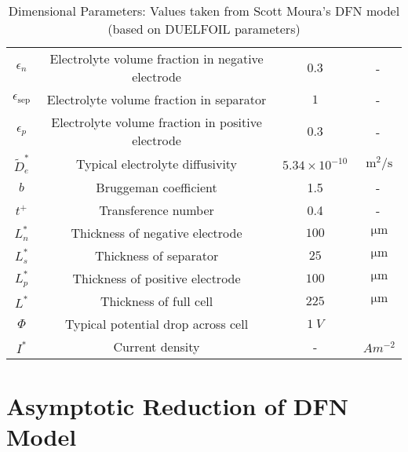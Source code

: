 \documentclass[preprint]{elsarticle}
\begin{document}
\begin{table}[h]
{\begin{tabular}{|c|c|c|c|}
        $\epsilon_n$ & Electrolyte volume fraction in negative electrode & $0.3$ & -\\
        $\epsilon_{\text{sep}}$ & Electrolyte volume fraction in separator & $1$ & -\\
        $\epsilon_p$ & Electrolyte volume fraction in positive electrode & $0.3$ & -\\
        $\tilde{D}_e^*$ & Typical electrolyte diffusivity & $5.34\times10^{-10}$ & $\SI{}{\metre^{2}/\second}$ \\
        $b$ & Bruggeman coefficient & 1.5 & - \\
        $t^+$ & Transference number & 0.4 & - \\
        $L_n^*$ & Thickness of negative electrode &$100$ & $\SI{}{\micro\metre}$  \\
        $L_{s}^*$ & Thickness of separator &$25$ & $\SI{}{\micro\metre}$ \\
        $L_p^*$ & Thickness of positive electrode &$100$ & $\SI{}{\micro\metre}$  \\ 
        $L^*$ & Thickness of full cell & $225$ & $\SI{}{\micro\metre}$ \\
        $\Phi$ & Typical potential drop across cell & $\SI{1}{V}$ \\
        $I^*$ & Current density & - & $\SI{}{A m^{-2}}$ \\ \hline
    \end{tabular}}
    \caption{Dimensional Parameters: Values taken from Scott Moura's DFN model (based on DUELFOIL parameters)} \label{tab:dimensional}
\end{table}
\fi


\section{Asymptotic Reduction of DFN Model}
\end{document}
